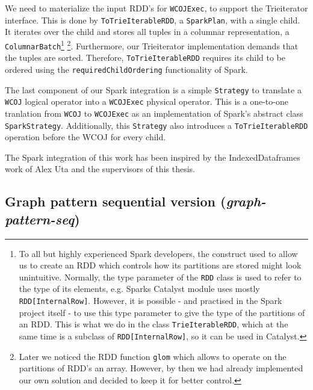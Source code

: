 We need to materialize the input RDD's for \texttt{WCOJExec}, to support the Trieiterator interface.
This is done by \texttt{ToTrieIterableRDD}, a \texttt{SparkPlan}, with a single child.
It iterates over the child and stores all tuples in a columnar representation, a \texttt{ColumnarBatch}\footnote{To all but highly
experienced Spark developers, the construct used to allow us to create an RDD which controls how its partitions are stored might look
unintuitive.
Normally, the type parameter of the \texttt{RDD} class is used to refer to the type of its elements, e.g. Sparks Catalyst module uses
mostly \texttt{RDD[InternalRow]}.
However, it is possible - and practised in the Spark project itself - to use this type parameter to give the type of the partitions of an
RDD.
This is what we do in the class \texttt{TrieIterableRDD}, which at the same time is a subclass of \texttt{RDD[InternalRow]}, so it can be
used in Catalyst.}
\footnote{Later we noticed the RDD function \texttt{glom} which allows to operate on the partitions of RDD's an array.
However, by then we had already implemented our own solution and decided to keep it for better control.}.
Furthermore, our Trieiterator implementation demands that the tuples are sorted.
Therefore, \texttt{ToTrieIterableRDD} requires its child to be ordered using the \texttt{requiredChildOrdering} functionality of Spark.

The last component of our Spark integration is a simple \texttt{Strategy} to translate a \texttt{WCOJ} logical operator into a
\texttt{WCOJExec} physical operator.
This is a one-to-one tranlation from \texttt{WCOJ} to \texttt{WCOJExec} as an implementation of Spark's abstract class
\texttt{SparkStrategy}.
Additionally, this \texttt{Strategy} also introduces a \texttt{ToTrieIterableRDD} operation before the WCOJ for every child.

The Spark integration of this work has been inspired by the IndexedDataframes~\cite{indexed-dataframes} work of Alex Uta and the supervisors
of this thesis.


\subsection{Graph pattern sequential version (\textit{graph-pattern-seq})}

